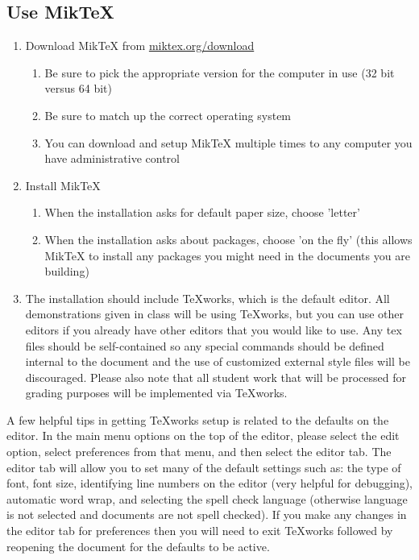 \documentclass[twoside]{article}
\begin{document}
\subsection{Use MikTeX}
\begin{enumerate}
\item Download MikTeX from \href{https://miktex.org/download}{ miktex.org/download}
\begin{enumerate}
\item Be sure to pick the appropriate version for the computer in use (32 bit versus 64 bit)
\item Be sure to match up the correct operating system
\item You can download and setup MikTeX multiple times to any computer you have administrative control

\end{enumerate}
\item Install MikTeX
\begin{enumerate}
\item When the installation asks for default paper size, choose 'letter'
\item When the installation asks about packages, choose 'on the fly' (this allows MikTeX to install any packages you might need in the documents you are building)

\end{enumerate}
\item The installation should include TeXworks, which is the default editor. All demonstrations given in class will be using TeXworks, but you can use other editors if you already have other editors that you would like to use. Any tex files should be self-contained so any special commands should be defined internal to the document and the use of customized external style files will be discouraged. Please also note that all student work that will be processed for grading purposes will be implemented via TeXworks. 
\end{enumerate}

A few helpful tips in getting TeXworks setup is related to the defaults on the editor. In the main menu options on the top of the editor, please select the edit option, select preferences from that menu, and then select the editor tab. The editor tab will allow you to set many of the default settings such as: the type of font, font size, identifying line numbers on the editor (very helpful for debugging), automatic word wrap, and selecting the spell check language (otherwise language is not selected and documents are not spell checked). If you make any changes in the editor tab for preferences then you will need to exit TeXworks followed by reopening the document for the defaults to be active. 
\end{document}

